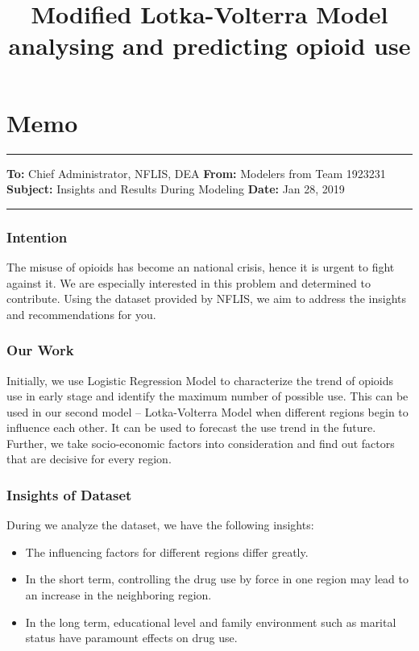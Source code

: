 \documentclass[12pt]{article}
\title{\large Modified Lotka-Volterra Model analysing and predicting opioid use}  %
\begin{document}

\section*{Memo}
\noindent\rule{\textwidth}{0.8pt}
\textbf{To:} Chief Administrator, NFLIS, DEA \newline
\textbf{From:} Modelers from Team 1923231\newline
\textbf{Subject:} Insights and Results During Modeling\newline
\textbf{Date:} Jan 28, 2019\newline
\noindent\rule{\textwidth}{0.8pt}
\subsubsection*{Intention}
The misuse of opioids has become an national crisis, hence it is urgent to fight against it. We are especially interested in this problem and determined to contribute. Using the dataset provided by NFLIS, we aim to address the insights and recommendations for you.

\subsubsection*{Our Work}
Initially, we use Logistic Regression Model to characterize the trend of opioids use in early stage and identify the maximum number of possible use. This can be used in our second model -- Lotka-Volterra Model when different regions begin to influence each other. It can be used to forecast the use trend in the future. Further, we take socio-economic factors into consideration and find out factors that are decisive for every region.

\subsubsection*{Insights of Dataset}
During we analyze the dataset, we have the following insights:
\begin{itemize}
	\item The influencing factors for different regions differ greatly.
	\item In the short term, controlling the drug use by force in one region may lead to an increase in the neighboring region.
	\item In the long term, educational level and family environment such as marital status have paramount effects on drug use.
\end{itemize}
\end{document}
